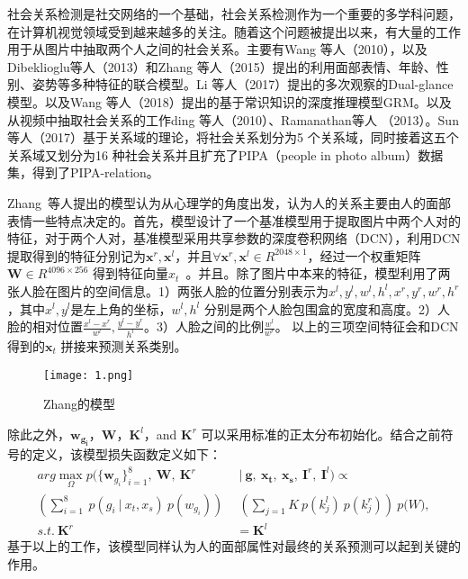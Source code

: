社会关系检测是社交网络的一个基础，社会关系检测作为一个重要的多学科问题，在计算机视觉领域受到越来越多的关注。随着这个问题被提出以来，有大量的工作用于从图片中抽取两个人之间的社会关系。主要有Wang 等人（2010）\cite{wang2010seeing}，以及Dibeklioglu等人（2013）\cite{dibeklioglu2013like}和Zhang 等人（2015）\cite{zhang2015learning}提出的利用面部表情、年龄、性别、姿势等多种特征的联合模型。Li 等人（2017）\cite{li2017dual-glance}提出的多次观察的Dual-glance模型。以及Wang 等人（2018）\cite{wang2018deep}提出的基于常识知识的深度推理模型GRM。以及从视频中抽取社会关系的工作ding 等人（2010）\cite{ding2010learning}、Ramanathan等人 （2013）\cite{ramanathan2013social}。Sun等人（2017）\cite{sun2017a}基于关系域的理论，将社会关系划分为5 个关系域，同时接着这五个关系域又划分为16 种社会关系并且扩充了PIPA（people in photo album）数据集\cite{zhang2015beyond}，得到了PIPA-relation。

Zhang~等人\cite{zhang2015learning}提出的模型认为从心理学的角度出发，认为人的关系主要由人的面部表情一些特点决定的。首先，模型设计了一个基准模型用于提取图片中两个人对的特征，对于两个人对，基准模型采用共享参数的深度卷积网络（DCN），利用DCN 提取得到的特征分别记为$\mathbf{x}^r,\mathbf{x}^l$，并且$\forall \mathbf{x}^r,\mathbf{x}^l \in R^{2048 \times 1}$，经过一个权重矩阵$\mathbf{W} \in R^{4096 \times 256}$ 得到特征向量$x_t$~。并且。除了图片中本来的特征，模型利用了两张人脸在图片的空间信息。1）两张人脸的位置分别表示为${x^l,y^l,w^l,h^l,x^r,y^r,w^r,h^r}$，其中$x^l,y^l$是左上角的坐标，$w^l,h^l$ 分别是两个人脸包围盒的宽度和高度。2）人脸的相对位置$\frac{x^l-x^r}{w^l},\frac{y^l-y^r}{h^l}$。3）人脸之间的比例$\frac{w^l}{w^r}$。 以上的三项空间特征会和DCN 得到的$\mathbf{x}_t$ 拼接来预测关系类别。
\begin{figure}[htpb]
	\centering
	\texttt{[image: 1.png]}
    \caption{Zhang的模型}
	\vspace*{-3.5mm}
	\label{fig:model_zhang}
\end{figure}
除此之外，$\mathbf{w_{g_{i}}}$，$\mathbf{W}$，$\mathbf{K}^l$，and $\mathbf{K}^r$ 可以采用标准的正太分布初始化。结合之前符号的定义，该模型损失函数定义如下：
\begin{equation}
\begin{split}
     arg\max \limits_{\Omega} p(\{\mathbf{w}_{g_{i}}\}_{i=1}^8, ~\mathbf{W}, ~\mathbf{K}^r & ~|~ \mathbf{g},~\mathbf{x_t},~\mathbf{x_s},~\mathbf{I}^r,~\mathbf{I}^l) \propto \\
     (\sum_{i=1}^{8}~p(g_i~|~x_t,x_s)~p(w_{g_i}))~ & ~(\sum_{j=1}{K}~p(k_j^l)~p(k_j^r))~p\mathbf(W), \\
     s.t. ~\mathbf{K}^r &= \mathbf{K}^l
\end{split}
\end{equation}
基于以上的工作，该模型同样认为人的面部属性对最终的关系预测可以起到关键的作用。

